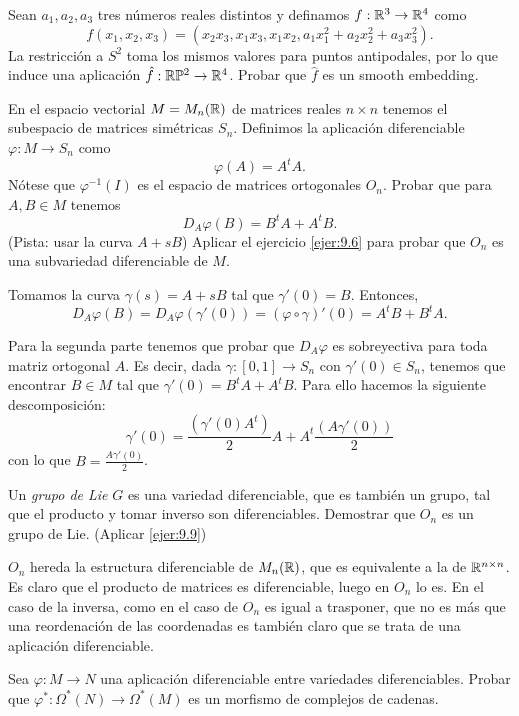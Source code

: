 \documentclass[twoside]{article}
\begin{document}
\begin{ejercicio}{9.8}
Sean $a_1,a_2,a_3$ tres números reales distintos y definamos $f:\mathbb{R}^3\to\mathbb{R}^4$ como
\[
f(x_1,x_2,x_3)=(x_2x_3,x_1x_3,x_1x_2,a_1x_1^2+a_2x_2^2+a_3x_3^2).
\]
La restricción a $S^2$ toma los mismos valores para puntos antipodales, por lo que induce una aplicación $\hat{f}:\mathbb{R}\mathbb{P}^2\to\mathbb{R}^4$. Probar que $\hat{f}$ es un smooth embedding.
\end{ejercicio}
\begin{solucion}
\end{solucion}

\newpage

\begin{ejercicio}{9.9}
En el espacio vectorial $M=M_n(\mathbb{R})$ de matrices reales $n\times n$ tenemos el subespacio de matrices simétricas $S_n$. Definimos la aplicación diferenciable $\varphi:M\to S_n$ como 
\[
\varphi(A)=A^tA.
\]
Nótese que $\varphi^{-1}(I)$ es el espacio de matrices ortogonales $O_n$. Probar que para $A,B\in M$ tenemos
\[
D_A\varphi(B)=B^tA+A^tB.
\]
(Pista: usar la curva $A+sB$)
Aplicar el ejercicio \ref{ejer:9.6} para probar que $O_n$ es una subvariedad diferenciable de $M$.
\end{ejercicio}
\begin{solucion}
Tomamos la curva $\gamma(s)=A+sB$ tal que $\gamma'(0)=B$. Entonces, 
\[
D_A\varphi(B)=D_A\varphi(\gamma'(0))=(\varphi\circ\gamma)'(0)=A^tB+B^tA.
\]

Para la segunda parte tenemos que probar que $D_A\varphi$ es sobreyectiva para toda matriz ortogonal $A$. Es decir, dada $\gamma:[0,1]\to S_n$ con $\gamma'(0)\in S_n$, tenemos que encontrar $B\in M$ tal que $\gamma'(0)=B^tA+A^tB$. Para ello hacemos la siguiente descomposición:
\[
\gamma'(0)=\frac{(\gamma'(0)A^t)}{2}A+A^t\frac{(A\gamma'(0))}{2}
\]
con lo que $B=\frac{A\gamma'(0)}{2}$.
\end{solucion}
\newpage

\begin{ejercicio}{9.10}
Un \emph{grupo de Lie} $G$ es una variedad diferenciable, que es también un grupo, tal que el producto y tomar inverso son diferenciables. Demostrar que $O_n$ es un grupo de Lie. (Aplicar \ref{ejer:9.9})
\end{ejercicio}
\begin{solucion}
$O_n$ hereda la estructura diferenciable de $M_n(\mathbb{R})$, que es equivalente a la de $\mathbb{R}^{n\times n}$. Es claro que el producto de matrices es diferenciable, luego en $O_n$ lo es. En el caso de la inversa, como en el caso de $O_n$ es igual a trasponer, que no es más que una reordenación de las coordenadas es también claro que se trata de una aplicación diferenciable.
\end{solucion}
\newpage

\begin{ejercicio}{9.6}
Sea $\varphi:M\to N$ una aplicación diferenciable entre variedades diferenciables. Probar que $\varphi^*:\Omega^*(N)\to\Omega^*(M)$ es un morfismo de complejos de cadenas.
\end{ejercicio}
\begin{solucion}
\end{solucion}
\end{document}
